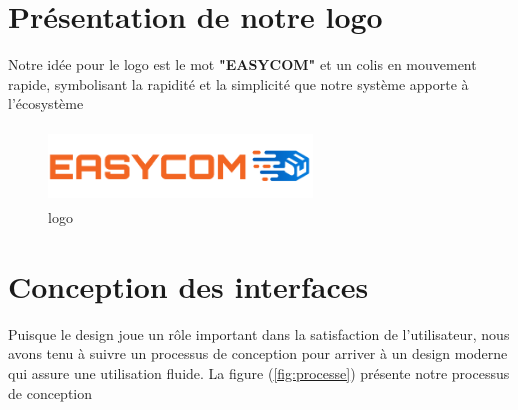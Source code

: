 \documentclass[edit,12pt,a4paper,ChapStyle,oneside,doubleinterligne]{report}
\begin{document}
\section{Présentation de notre logo}
Notre idée pour le logo est le mot \textbf{"EASYCOM"} et un colis en mouvement rapide, symbolisant la rapidité et la simplicité que notre système apporte à l'écosystème
\begin{figure}[H] 
    \centering
    \includegraphics[width=7cm , height = 2cm , angle=360]{images/logo.png}
    \caption{logo}
    \label{fig:logo}
\end{figure}
\section{Conception des interfaces }
Puisque le design joue un rôle important dans la satisfaction de l'utilisateur, nous avons tenu à suivre un processus de conception pour arriver à un design moderne qui assure une utilisation fluide.
 La figure (\ref{fig:processe}) présente notre processus de conception
 
\end{document}
